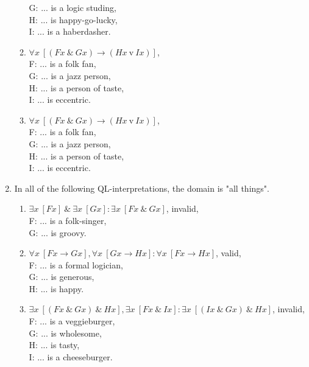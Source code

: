 \documentclass[a4paper,12pt]{article}
\newcommand{\ra}{\rightarrow}
\newcommand{\tv}{ \ \textrm{v} \ }
\newcommand{\ta}{ \ \& \ }
\newcommand{\all}{\forall}
\newcommand{\ex}{\exists}
\begin{document}
\begin{enumerate}[label=\arabic*,leftmargin=*]
\begin{enumerate}[label=(\roman*),leftmargin=*]
                    G: ... is a logic studing,\\
                    H: ... is happy-go-lucky,\\
                    I: ... is a haberdasher.
                \item $\all x \ [(Fx \ta Gx) \ra (Hx \tv Ix)]$,\\
                    F: ... is a folk fan,\\
                    G: ... is a jazz person,\\
                    H: ... is a person of taste,\\
                    I: ... is eccentric.
                \item $\all x \ [(Fx \ta Gx) \ra (Hx \tv Ix)]$,\\
                    F: ... is a folk fan,\\
                    G: ... is a jazz person,\\
                    H: ... is a person of taste,\\
                    I: ... is eccentric.
            \end{enumerate}
        \newpage
        \item In all of the following QL-interpretations, the domain is "all things".
            \begin{enumerate}[label=(\roman*),leftmargin=*]
                \item $\ex x \ [Fx] \ta \ex x \ [Gx] : \ex x \ [Fx \ta Gx]$, invalid,\\
                    F: ... is a folk-singer,\\
                    G: ... is groovy.
                \item $\all x \ [Fx \ra Gx], \all x \ [Gx \ra Hx] : \all x \ [Fx \ra Hx]$, valid,\\
                    F: ... is a formal logician,\\
                    G: ... is generous,\\
                    H: ... is happy.
                \item $\ex x \ [(Fx \ta Gx) \ta Hx], \ex x \ [Fx \ta Ix] : \ex x \ [(Ix \ta Gx) \ta Hx]$, invalid,\\
                    F: ... is a veggieburger,\\
                    G: ... is wholesome,\\
                    H: ... is tasty,\\
                    I: ... is a cheeseburger.

\end{enumerate}
\end{enumerate}
\end{document}
